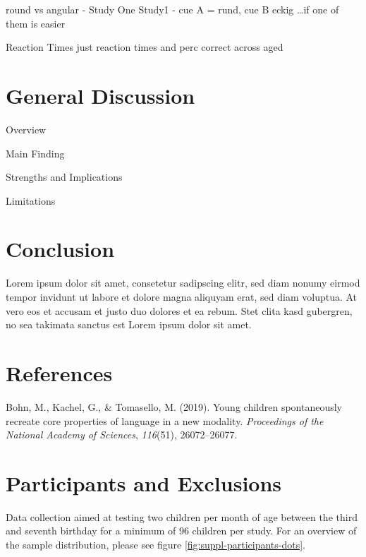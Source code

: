 \documentclass[
  man]{apa6}
\newlength{\cslhangindent}
\newenvironment{CSLReferences}[2] %
 {\begin{list}{}{%
  \setlength{\itemindent}{0pt}
  \setlength{\leftmargin}{0pt}
  \setlength{\parsep}{0pt}
  \ifodd #1
   \setlength{\leftmargin}{\cslhangindent}
   \setlength{\itemindent}{-1\cslhangindent}
  \fi
  \setlength{\itemsep}{#2\baselineskip}}}
 {\end{list}}
\begin{document}
round vs angular
- Study One Study1 - cue A = rund, cue B eckig \ldots if one of them is easier

Reaction Times
just reaction times and perc correct across aged

\section{General Discussion}\label{general-discussion}

Overview

Main Finding

Strengths and Implications

Limitations

\section{Conclusion}\label{conclusion}

Lorem ipsum dolor sit amet, consetetur sadipscing elitr, sed diam nonumy eirmod tempor invidunt ut labore et dolore magna aliquyam erat, sed diam voluptua. At vero eos et accusam et justo duo dolores et ea rebum. Stet clita kasd gubergren, no sea takimata sanctus est Lorem ipsum dolor sit amet.

\newpage

\section{References}\label{references}

\label{refs}
\begin{CSLReferences}{1}{0}
Bohn, M., Kachel, G., \& Tomasello, M. (2019). Young children spontaneously recreate core properties of language in a new modality. \emph{Proceedings of the National Academy of Sciences}, \emph{116}(51), 26072--26077.

\end{CSLReferences}

\newpage

\appendix


\section{Participants and Exclusions}\label{participants-and-exclusions}

Data collection aimed at testing two children per month of age between the third and seventh birthday for a minimum of 96 children per study. For an overview of the sample distribution, please see figure \ref{fig:suppl-participants-dots}.
\end{document}
